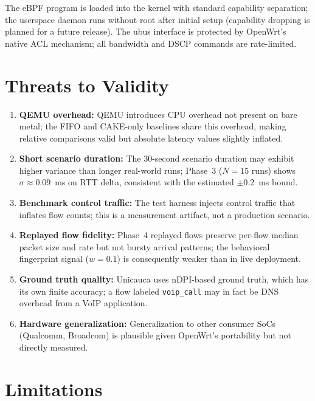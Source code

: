 The eBPF program is loaded into the kernel with standard capability separation; the userspace daemon runs without root after initial setup (capability dropping is planned for a future release). The ubus interface is protected by OpenWrt's native ACL mechanism; all bandwidth and DSCP commands are rate-limited.

\section{Threats to Validity}

\begin{enumerate}
  \item \textbf{QEMU overhead:} QEMU introduces CPU overhead not present on bare metal; the FIFO and CAKE-only baselines share this overhead, making relative comparisons valid but absolute latency values slightly inflated.

  \item \textbf{Short scenario duration:} The 30-second scenario duration may exhibit higher variance than longer real-world runs; Phase~3 ($N{=}15$ runs) shows $\sigma{\approx}0.09$~ms on RTT delta, consistent with the estimated $\pm$0.2~ms bound.

  \item \textbf{Benchmark control traffic:} The test harness injects control traffic that inflates flow counts; this is a measurement artifact, not a production scenario.

  \item \textbf{Replayed flow fidelity:} Phase~4 replayed flows preserve per-flow median packet size and rate but not bursty arrival patterns; the behavioral fingerprint signal ($w=0.1$) is consequently weaker than in live deployment.

  \item \textbf{Ground truth quality:} Unicauca uses nDPI-based ground truth, which has its own finite accuracy; a flow labeled \texttt{voip\_call} may in fact be DNS overhead from a VoIP application.

  \item \textbf{Hardware generalization:} Generalization to other consumer SoCs (Qualcomm, Broadcom) is plausible given OpenWrt's portability but not directly measured.
\end{enumerate}

\section{Limitations}


